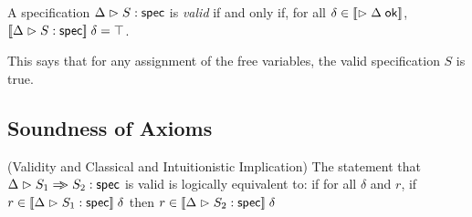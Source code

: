 A specification ${\Delta} \vartriangleright {S} : \mathsf{spec}$ is \emph{valid} if and only if, for all
$\delta \in [\![{\vartriangleright {\Delta} \;\mathsf{ok}}]\!]$, $[\![{{\Delta} \vartriangleright {S} : \mathsf{spec}}]\!]\;\delta = \top$. 

This says that for any assignment of the free variables, the valid
specification $S$ is true.

\subsection{Soundness of Axioms}

\begin{lemma}{(Validity and Classical and Intuitionistic Implication)}
The statement that ${\Delta} \vartriangleright {S_1 \Rightarrow\!\!\!>S_2} : \mathsf{spec}$ is valid is logically equivalent to: if
for all $\delta$ and $r$, if $r \in [\![{{\Delta} \vartriangleright {S_1} : \mathsf{spec}}]\!]\;\delta$ then $r \in [\![{{\Delta} \vartriangleright {S_2} : \mathsf{spec}}]\!]\;\delta$  
\end{lemma}

